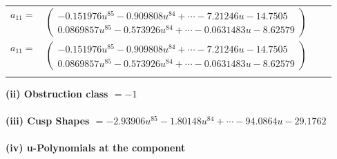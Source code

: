 \documentclass[1p]{elsarticle_modified}
\theoremstyle{definition}
\begin{document}
\begin{tabular}{m{7pt} m{180pt} m{7pt} m{180pt} }
\flushright $a_{11}=$&$\begin{pmatrix}-0.151976 u^{85}-0.909808 u^{84}+\cdots-7.21246 u-14.7505\\0.0869857 u^{85}-0.573926 u^{84}+\cdots-0.0631483 u-8.62579\end{pmatrix}$\\ \flushright $a_{11}=$&$\begin{pmatrix}-0.151976 u^{85}-0.909808 u^{84}+\cdots-7.21246 u-14.7505\\0.0869857 u^{85}-0.573926 u^{84}+\cdots-0.0631483 u-8.62579\end{pmatrix}$\\&\end{tabular}
\flushleft \textbf{(ii) Obstruction class $= -1$}\\~\\
\flushleft \textbf{(iii) Cusp Shapes $= -2.93906 u^{85}-1.80148 u^{84}+\cdots-94.0864 u-29.1762$}\\~\\
\newpage\renewcommand{\arraystretch}{1}
\flushleft \textbf{(iv) u-Polynomials at the component}\newline \\
\end{document}
